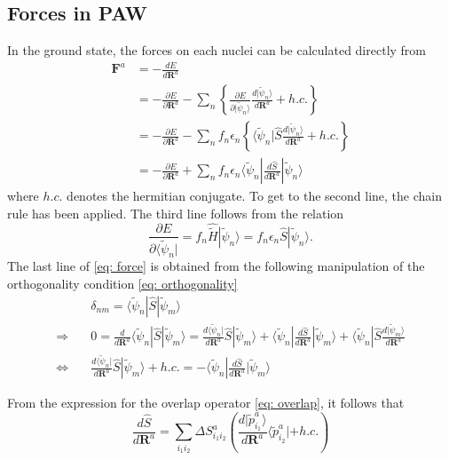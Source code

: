 \documentclass[a4paper]{article}
\newcommand{\f}[1]{\mathbf{#1}}
\newcommand{\s}[1]{\tilde{#1}}
\newcommand{\ws}[1]{\widetilde{#1}}
\newcommand{\h}[1]{\hat{#1}}
\newcommand{\wh}[1]{\widehat{#1}}
\newcommand{\bR}{\mathbf{R}}
\newcommand{\bra}[1]{\langle #1 |}
\newcommand{\ket}[1]{| #1 \rangle}
\begin{document}
\subsection{Forces in PAW}\label{sec: forces}
In the ground state, the forces on each nuclei can be calculated directly from
% 
\begin{equation}
  \label{eq: force}
  \begin{split}
    \f{F}^a &= -\frac{dE}{d\bR^a} \\
&= -\frac{\partial E}{\partial \bR^a} - \sum_n\left\{ \frac{\partial E}{\partial \ket{\s{\psi}_n}} \frac{d \ket{\s{\psi}_n}}{d \bR^a} + h.c.\right\}\\
&= -\frac{\partial E}{\partial \bR^a} - \sum_n f_n \epsilon_n \left\{ \bra{\s{\psi}_n}\h{S} \frac{d \ket{\s{\psi}_n}}{d \bR^a} + h.c.\right\}\\
&= -\frac{\partial E}{\partial \bR^a} + \sum_n f_n \epsilon_n \bra{\s{\psi}_n}\frac{d\h{S}}{d\bR^a}\ket{\s{\psi}_n}
  \end{split}
\end{equation}
%
where $h.c.$ denotes the hermitian conjugate. To get to the second
line, the chain rule has been applied. The third line follows from the
relation
%
\begin{equation}
  \frac{\partial E}{\partial \bra{\s{\psi}_n}} = f_n \wh{\ws{H}} \ket{\s{\psi}_n} = f_n \epsilon_n \h{S} \ket{\s{\psi}_n}.
\end{equation}
%
The last line of \ref{eq: force} is obtained from the following
manipulation of the orthogonality condition \ref{eq: orthogonality}
%
\begin{equation}
  \begin{split}
    &\quad \delta_{nm} = \bra{\s{\psi}_n}\h{S}\ket{\s{\psi}_m} \\
    \Rightarrow &\quad 0 = \frac{d}{d\bR^a} \bra{\s{\psi}_n}\h{S}\ket{\s{\psi}_m} = \frac{d\bra{\s{\psi}_n}}{d\bR^a}\h{S}\ket{\s{\psi}_m}  + \bra{\s{\psi}_n}\frac{d\h{S}}{d\bR^a}\ket{\s{\psi}_m} + \bra{\s{\psi}_n}\h{S}\frac{d\ket{\s{\psi}_m}}{d\bR^a}\\
    \Leftrightarrow & \quad \frac{d\bra{\s{\psi}_n}}{d\bR^a}\h{S}\ket{\s{\psi}_m} + h.c. = - \bra{\s{\psi}_n}\frac{d\h{S}}{d\bR^a}\ket{\s{\psi}_m}
  \end{split}
\end{equation}
%
\par From the expression for the overlap operator \ref{eq: overlap},
it follows that
%
\begin{equation}
  \frac{d\h{S}}{d\bR^a} = \sum_{i_1i_2} \Delta S^a_{i_1i_2}\left(\frac{d \ket{\s{p}^a_{i_1}}}{d\bR^a}\bra{\s{p}^a_{i_2}} + h.c. \right)
\end{equation}
\end{document}
